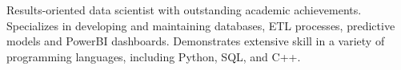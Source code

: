 \newline
	\begin{cvparagraph}
		Results-oriented data scientist with outstanding academic achievements.
		Specializes in developing and maintaining databases, ETL processes,
		predictive models and PowerBI dashboards. Demonstrates extensive skill in a
		variety of programming languages, including Python, SQL, and C++.
	\end{cvparagraph}
